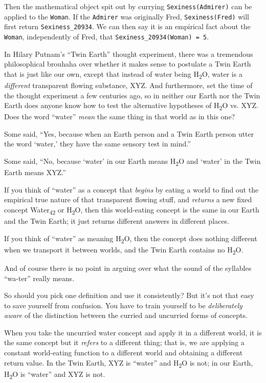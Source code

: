 {
 Then the mathematical object spit out by currying
\texttt{Sexiness(Admirer)} can be applied to the \texttt{Woman}. If the \texttt{Admirer} was
originally Fred, \texttt{Sexiness(Fred)} will first return \texttt{Sexiness\_20934}. We
can then say it is an empirical fact about the \texttt{Woman}, independently of
Fred, that \texttt{Sexiness\_20934(Woman) = 5}.}

{
 In Hilary Putnam's ``Twin
Earth'' thought experiment, there was a tremendous
philosophical brouhaha over whether it makes sense to postulate a Twin
Earth that is just like our own, except that instead of water being
H\textsubscript{2}O, water is a \textit{different} transparent flowing
substance, XYZ. And furthermore, set the time of the thought experiment
a few centuries ago, so in neither our Earth nor the Twin Earth does
anyone know how to test the alternative hypotheses of
H\textsubscript{2}O vs. XYZ. Does the word
``water'' \textit{mean} the same
thing in that world as in this one?}

{
 Some said, ``Yes, because when an Earth person
and a Twin Earth person utter the word
`water,' they have the same sensory test
in mind.''}

{
 Some said, ``No, because
`water' in our Earth means
H\textsubscript{2}O and `water' in the
Twin Earth means XYZ.''}

{
 If you think of ``water'' as a
concept that \textit{begins} by eating a world to find out the
empirical true nature of that transparent flowing stuff, and
\textit{returns} a new fixed concept Water\textsubscript{42} or
H\textsubscript{2}O, then this world-eating concept is the same in our
Earth and the Twin Earth; it just returns different answers in
different places.}

{
 If you think of ``water'' as
meaning H\textsubscript{2}O, then the concept does nothing different
when we transport it between worlds, and the Twin Earth contains no
H\textsubscript{2}O.}

{
 And of course there is no point in arguing over what the sound of
the syllables ``wa-ter'' really
means.}

{
 So should you pick one definition and use it consistently? But
it's not that easy to save yourself from confusion. You
have to train yourself to be \textit{deliberately aware} of the
distinction between the curried and uncurried forms of concepts.}

{
 When you take the uncurried water concept and apply it in a
different world, it is the same concept but it \textit{refers} to a
different thing; that is, we are applying a constant world-eating
function to a different world and obtaining a different return value.
In the Twin Earth, XYZ is ``water''
and H\textsubscript{2}O is not; in our Earth, H\textsubscript{2}O is
``water'' and XYZ is not.}

